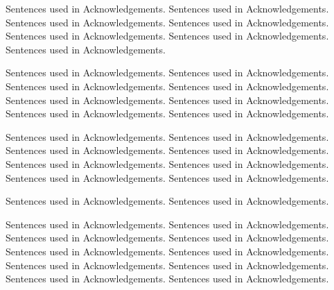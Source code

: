 Sentences used in Acknowledgements.
Sentences used in Acknowledgements.
Sentences used in Acknowledgements.
Sentences used in Acknowledgements.
Sentences used in Acknowledgements.
Sentences used in Acknowledgements.
Sentences used in Acknowledgements.

Sentences used in Acknowledgements.
Sentences used in Acknowledgements.
Sentences used in Acknowledgements.
Sentences used in Acknowledgements.
Sentences used in Acknowledgements.
Sentences used in Acknowledgements.
Sentences used in Acknowledgements.
Sentences used in Acknowledgements.

Sentences used in Acknowledgements.
Sentences used in Acknowledgements.
Sentences used in Acknowledgements.
Sentences used in Acknowledgements.
Sentences used in Acknowledgements.
Sentences used in Acknowledgements.
Sentences used in Acknowledgements.
Sentences used in Acknowledgements.

Sentences used in Acknowledgements.
Sentences used in Acknowledgements.

Sentences used in Acknowledgements.
Sentences used in Acknowledgements.
Sentences used in Acknowledgements.
Sentences used in Acknowledgements.
Sentences used in Acknowledgements.
Sentences used in Acknowledgements.
Sentences used in Acknowledgements.
Sentences used in Acknowledgements.
Sentences used in Acknowledgements.
Sentences used in Acknowledgements.

